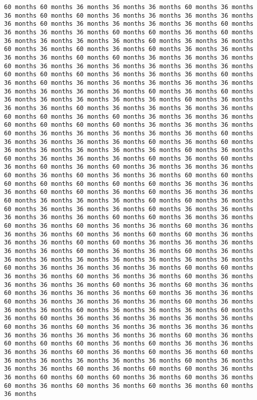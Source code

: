 \documentclass[11pt]{article}
\begin{document}
\begin{Verbatim}[commandchars=\\\{\}, frame=single, framerule=2mm, rulecolor=\color{outerrorbackground}]
60 months 60 months 36 months 36 months 36 months 60 months 36 months 36 months 60 months 60 months 36 months 36 months 36 months 36 months 36 months 60 months 36 months 36 months 36 months 36 months 60 months 36 months 36 months 36 months 60 months 60 months 36 months 60 months 36 months 36 months 36 months 36 months 60 months 36 months 36 months 60 months 36 months 60 months 36 months 60 months 36 months 36 months 36 months 36 months 60 months 60 months 36 months 36 months 36 months 60 months 36 months 36 months 36 months 36 months 36 months 36 months 60 months 60 months 60 months 36 months 36 months 36 months 60 months 36 months 60 months 36 months 36 months 36 months 36 months 36 months 36 months 36 months 36 months 36 months 60 months 36 months 60 months 36 months 36 months 36 months 36 months 36 months 60 months 36 months 36 months 36 months 60 months 36 months 36 months 36 months 36 months 60 months 60 months 36 months 60 months 36 months 36 months 36 months 60 months 60 months 60 months 60 months 36 months 36 months 36 months 60 months 36 months 36 months 36 months 36 months 36 months 60 months 36 months 36 months 36 months 36 months 60 months 36 months 60 months 36 months 36 months 36 months 36 months 36 months 60 months 36 months 60 months 36 months 36 months 36 months 60 months 36 months 60 months 36 months 60 months 36 months 60 months 36 months 36 months 36 months 60 months 36 months 60 months 36 months 36 months 60 months 60 months 60 months 60 months 60 months 60 months 60 months 36 months 36 months 36 months 60 months 60 months 36 months 60 months 36 months 36 months 60 months 36 months 36 months 36 months 60 months 60 months 36 months 60 months 36 months 36 months 36 months 60 months 36 months 36 months 36 months 36 months 36 months 60 months 60 months 36 months 36 months 60 months 36 months 60 months 36 months 36 months 60 months 36 months 36 months 36 months 60 months 36 months 60 months 60 months 36 months 36 months 36 months 60 months 60 months 36 months 36 months 36 months 36 months 36 months 60 months 36 months 36 months 60 months 36 months 36 months 36 months 36 months 36 months 36 months 36 months 36 months 60 months 36 months 36 months 36 months 36 months 60 months 60 months 36 months 36 months 60 months 36 months 36 months 60 months 36 months 36 months 36 months 36 months 60 months 36 months 60 months 36 months 60 months 36 months 36 months 36 months 60 months 36 months 36 months 60 months 36 months 36 months 36 months 36 months 60 months 36 months 36 months 36 months 60 months 36 months 36 months 36 months 60 months 36 months 60 months 36 months 36 months 36 months 36 months 36 months 60 months 36 months 60 months 36 months 36 months 36 months 36 months 36 months 36 months 36 months 36 months 36 months 60 months 36 months 60 months 60 months 60 months 36 months 60 months 36 months 36 months 36 months 36 months 60 months 36 months 60 months 36 months 60 months 36 months 36 months 36 months 36 months 36 months 60 months 36 months 36 months 36 months 60 months 36 months 60 months 60 months 36 months 36 months 60 months 60 months 60 months 36 months 60 months 36 months 60 months 36 months 60 months 36 months 60 months 36 months 60 months 36 months 
\end{Verbatim}
\end{document}
